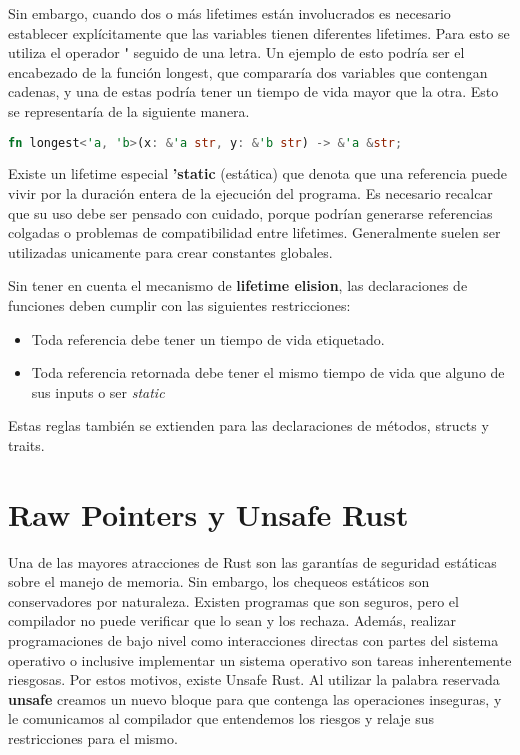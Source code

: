 Sin embargo, cuando dos o más lifetimes están involucrados es necesario establecer explícitamente que las variables tienen diferentes lifetimes. Para esto se utiliza el operador \textbf{\'} seguido de una letra. Un ejemplo de esto podría ser el encabezado de la función longest, que compararía dos variables que contengan cadenas, y una de estas podría tener un tiempo de vida mayor que la otra. Esto se representaría de la siguiente manera.

\begin{lstlisting}[language=Rust]
    fn longest<'a, 'b>(x: &'a str, y: &'b str) -> &'a &str;
\end{lstlisting}

Existe un lifetime especial \textbf{'static} (estática) que denota que una referencia puede vivir por la duración entera de la ejecución del programa. Es necesario recalcar que su uso debe ser pensado con cuidado, porque podrían generarse referencias colgadas o problemas de compatibilidad entre lifetimes. Generalmente suelen ser utilizadas unicamente para crear constantes globales.

Sin tener en cuenta el mecanismo de \textbf{lifetime elision}, las declaraciones de funciones deben cumplir con las siguientes restricciones:
\begin{itemize}
    \item Toda referencia debe tener un tiempo de vida etiquetado.
    \item Toda referencia retornada debe tener el mismo tiempo de vida que alguno de sus inputs o ser \textit{static}
\end{itemize}
Estas reglas también se extienden para las declaraciones de métodos, structs y traits.

\section{Raw Pointers y Unsafe Rust}

Una de las mayores atracciones de Rust son las garantías de seguridad estáticas sobre el manejo de memoria. Sin embargo, los chequeos estáticos son conservadores por naturaleza. Existen programas que son seguros, pero el compilador no puede verificar que lo sean y los rechaza. Además, realizar programaciones de bajo nivel como interacciones directas con partes del sistema operativo o inclusive implementar un sistema operativo son tareas inherentemente riesgosas. Por estos motivos, existe Unsafe Rust. Al utilizar la palabra reservada \textbf{unsafe} creamos un nuevo bloque para que contenga las operaciones inseguras, y le comunicamos al compilador que entendemos los riesgos y relaje sus restricciones para el mismo.

